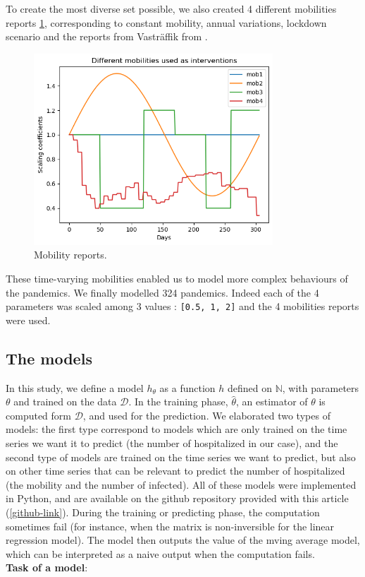 To create the most diverse set possible, we also created 4 different mobilities reports \ref*{fig:mobilities}, corresponding to constant mobility, annual variations, lockdown scenario and the reports from Vasträffik from \cite{gerlee2021predicting}. 
\begin{figure}
    \centering
    \includegraphics[width=0.8\textwidth]{figures/mobilities.png}
    \caption{Mobility reports.}
    \label{fig:mobilities}
\end{figure}
These time-varying mobilities enabled us to model more complex behaviours of the pandemics. 
We finally modelled 324 pandemics. 
Indeed each of the 4 parameters was scaled among 3 values : \texttt{[0.5, 1, 2]} and the 4 mobilities reports were used.


\subsection{The models}

In this study, we define a model ${h}_{\theta }$ as a function ${h}$  defined on $ \mathbb{N}$, with parameters $\theta$ and trained on the data $\mathcal{D}$.
In the training phase, $\hat{\theta}$,  an estimator of $\theta$ is computed form $\mathcal{D}$, and used for the prediction.  
We elaborated two types of models: the first type correspond to models which are only trained on the time series we want it to predict (the number of hospitalized in our case), and the second type of models are trained on the time series we want to predict, but also on other time series that can be relevant to predict the number of hospitalized (the mobility and the number of infected). 
All of these models were implemented in Python, and are available on the github repository provided with this article (\ref*{github-link}).
During the training or predicting phase, the computation sometimes fail (for instance, when the matrix is non-inversible for the linear regression model). 
The model then outputs the value of the mving average model, which can be interpreted as a naive output when the computation fails. \\
\textbf{Task of a model}: \\

